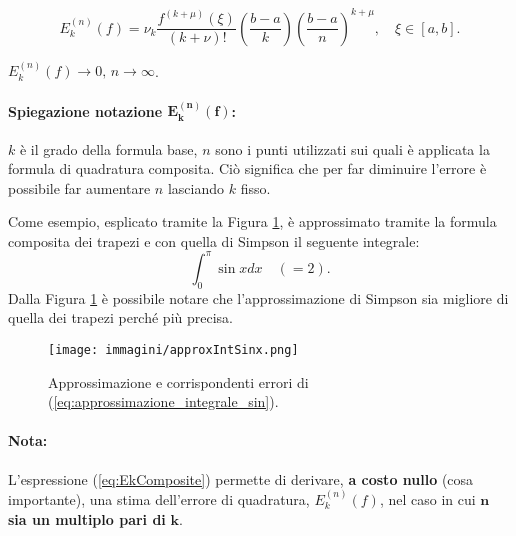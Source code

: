 \begin{definition}
	\begin{equation}\label{eq:EkComposite}
 E_k^{(n)}(f)=\nu_k\frac{f^{(k+\mu)}(\xi)}{(k+\nu)!}\left(\frac{b-a}{k}\right)\left(\frac{b-a}{n}\right)^{k+\mu}, \quad \xi\in[a,b].
\end{equation}
\end{definition}

\begin{remark}
	$E_k^{(n)}(f)\rightarrow 0,\, n\rightarrow\infty$.
\end{remark}

\paragraph{Spiegazione notazione $\boldsymbol{E_k^{(n)}(f)}$:} $k$ è il grado della formula base, $n$ sono i punti utilizzati sui quali è applicata la formula di quadratura composita. Ciò significa che per far diminuire l'errore è possibile far aumentare $n$ lasciando $k$ fisso.

\begin{example}\label{example:approssimazione_integrale_sin}
    Come esempio, esplicato tramite la Figura \ref{fig:approxIntSinx}, è approssimato tramite la formula composita dei trapezi e con quella di Simpson il seguente integrale:
    \begin{equation}\label{eq:approssimazione_integrale_sin}
        \int_0^\pi \sin{x}dx\quad (=2).
    \end{equation}
    Dalla Figura \ref{fig:approxIntSinx} è possibile notare che l'approssimazione di Simpson sia migliore di quella dei trapezi perché più precisa.
\end{example}

\begin{figure}
    \centering
    \texttt{[image: immagini/approxIntSinx.png]}
    \caption{Approssimazione e corrispondenti errori di (\ref{eq:approssimazione_integrale_sin}).}\label{fig:approxIntSinx}
\end{figure}

\paragraph{Nota:} L'espressione (\ref{eq:EkComposite}) permette di derivare, \textbf{a costo nullo} (cosa importante), una stima dell'errore di quadratura, $E_k^{(n)}(f)$, nel caso in cui $\boldsymbol n$ \textbf{sia un multiplo pari di} $\boldsymbol k$.

